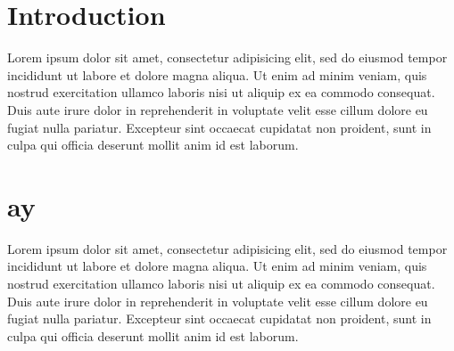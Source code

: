 \documentclass[12pt]{article}
\begin{document}
    \tableofcontents

    \newpage
    \section*{Introduction}
    Lorem ipsum dolor sit amet, consectetur adipisicing elit, sed do eiusmod
    tempor incididunt ut labore et dolore magna aliqua. Ut enim ad minim veniam,
    quis nostrud exercitation ullamco laboris nisi ut aliquip ex ea commodo
    consequat. Duis aute irure dolor in reprehenderit in voluptate velit esse
    cillum dolore eu fugiat nulla pariatur. Excepteur sint occaecat cupidatat non
    proident, sunt in culpa qui officia deserunt mollit anim id est laborum.

    \newpage
    \section*{ay}
    Lorem ipsum dolor sit amet, consectetur adipisicing elit, sed do eiusmod
    tempor incididunt ut labore et dolore magna aliqua. Ut enim ad minim veniam,
    quis nostrud exercitation ullamco laboris nisi ut aliquip ex ea commodo
    consequat. Duis aute irure dolor in reprehenderit in voluptate velit esse
    cillum dolore eu fugiat nulla pariatur. Excepteur sint occaecat cupidatat non
    proident, sunt in culpa qui officia deserunt mollit anim id est laborum.
\end{document}
